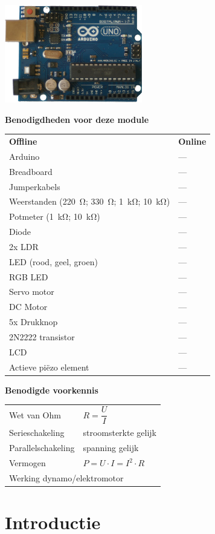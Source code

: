 \documentclass{arduino}
\begin{document}
\includegraphics[width=6cm]{1. Arduino}

\textbf{Benodigdheden voor deze module}

\begin{tabular}{p{}p{}}
\textbf{Offline} & \textbf{Online}\\
Arduino & --- \\
Breadboard & --- \\
Jumperkabels & --- \\
Weerstanden (\SI{220}{\ohm}; \SI{330}{\ohm}; \SI{1}{\kilo\ohm}; \SI{10}{\kilo\ohm}) & --- \\
Potmeter (\SI{1}{\kilo\ohm}; \SI{10}{\kilo\ohm}) & --- \\
Diode & --- \\
2x LDR & --- \\
LED (rood, geel, groen) & --- \\
RGB LED & --- \\
Servo motor & --- \\
DC Motor & --- \\
5x Drukknop & --- \\
2N2222 transistor & --- \\
LCD & --- \\
Actieve piëzo element & --- \\
\end{tabular}

\textbf{Benodigde voorkennis}

\begin{tabular}{ll}
Wet van Ohm & $R = \dfrac{U}{I}$\\
Serieschakeling & stroomsterkte gelijk \\
Parallelschakeling & spanning gelijk \\
Vermogen & $P = U \cdot I = I^2 \cdot R$ \\
\multicolumn{2}{l}{Werking dynamo/elektromotor}\\
\end{tabular}

\newpage

\section{Introductie}
\end{document}
